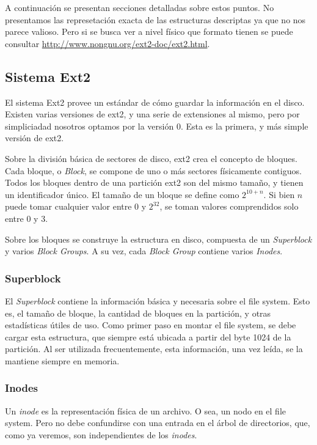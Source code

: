 \documentclass[a4paper,10pt]{article}
\begin{document}
A continuación se presentan secciones detalladas sobre estos puntos.
No presentamos las represetación exacta de las estructuras descriptas ya que no nos parece valioso.
Pero si se busca ver a nivel físico que formato tienen se puede consultar \url{http://www.nongnu.org/ext2-doc/ext2.html}.

\subsection{Sistema Ext2}
El sistema Ext2 provee un estándar de cómo guardar la información en el disco.
Existen varias versiones de ext2, y una serie de extensiones al mismo, pero por simpliciadad nosotros optamos por la versión 0.
Esta es la primera, y más simple versión de ext2.

Sobre la división básica de sectores de disco, ext2 crea el concepto de bloques.
Cada bloque, o \textit{Block}, se compone de uno o más sectores físicamente contiguos.
Todos los bloques dentro de una partición ext2 son del mismo tamaño, y tienen un identificador único.
El tamaño de un bloque se define como $ 2^{10 + n} $.
Si bien $n$ puede tomar cualquier valor entre 0 y $ 2^{32} $, se toman valores comprendidos solo entre 0 y 3.

Sobre los bloques se construye la estructura en disco, compuesta de un \textit{Superblock} y varios \textit{Block Groups}.
A su vez, cada \textit{Block Group} contiene varios \textit{Inodes}.

\subsubsection{Superblock}
El \textit{Superblock} contiene la información básica y necesaria sobre el file system.
Esto es, el tamaño de bloque, la cantidad de bloques en la partición, y otras estadísticas útiles de uso.
Como primer paso en montar el file system, se debe cargar esta estructura, que siempre está ubicada a partir del byte 1024 de la partición.
Al ser utilizada frecuentemente, esta información, una vez leída, se la mantiene siempre en memoria.

\subsubsection{Inodes}
Un \textit{inode} es la representación física de un archivo.
O sea, un nodo en el file system.
Pero no debe confundirse con una entrada en el árbol de directorios, que, como ya veremos, son independientes de los \textit{inodes}.
\end{document}
